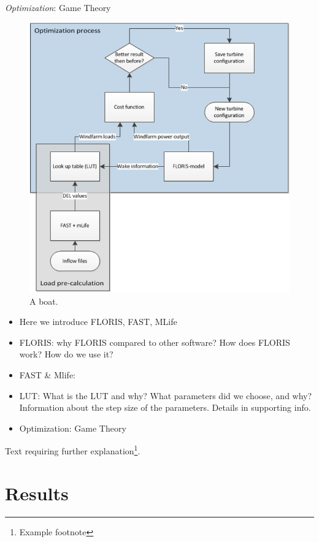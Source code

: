 \documentclass[twoside,twocolumn]{article}
\begin{document}
\textit{Optimization}: Game Theory
\begin{figure}
  \includegraphics[width=\linewidth]{OptimizationProcess.png}
  \caption{A boat.}
  \label{fig:optim}
\end{figure}
	\begin{itemize}
		\item Here we introduce FLORIS, FAST, MLife
		\item FLORIS: why FLORIS compared to other software? How does FLORIS work? How do we use it?
		\item FAST \& Mlife:
		\item LUT: What is the LUT and why? What parameters did we choose, and why? Information about the step size of the parameters. Details in supporting info.
		\item Optimization: Game Theory
	\end{itemize}
	\blindtext %
	





	Text requiring further explanation\footnote{Example footnote}.
	
	
	\section{Results}
	
\end{document}
